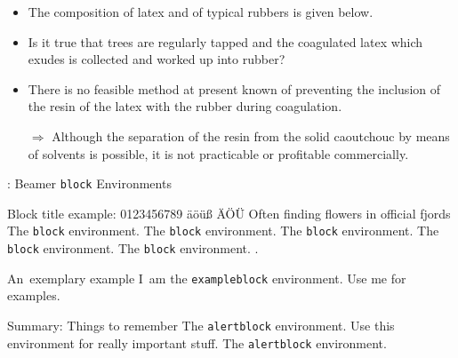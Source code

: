 \begin{frame}{\titleprefix}

	\begin{itemize}
		\item The composition of latex and of typical rubbers is given below.
		\item Is it true that trees are regularly tapped and the coagulated latex which exudes is collected and worked up into rubber?
	\end{itemize}
	
	\pause

	\begin{itemize}
		\item There is no feasible method at present known of preventing the inclusion of the resin of the latex with the rubber during coagulation.
		\item[$\Rightarrow$\hspace{-2.5pt}] Although the separation of the resin from the solid caoutchouc by means of solvents is possible, it is not practicable or profitable commercially.
	\end{itemize}

\end{frame}


\begin{frame}{\titleprefix: Beamer \texttt{block} Environments}

	\begin{block}{Block title example: 0123456789 äöüß ÄÖÜ Often finding flowers in official fjords}
		The \texttt{block} environment. The \texttt{block} environment. The \texttt{block} environment. The \texttt{block} environment. The \texttt{block} environment. \insertblocktitle.\strut  %
	\end{block}%
	
	\begin{exampleblock}{An~exemplary example}
		I~am the \texttt{exampleblock} environment. Use me for examples.\strut  %
	\end{exampleblock}
	
	\begin{alertblock}{Summary: Things to remember}
		The \texttt{alertblock} environment. Use this environment for really important stuff. The \texttt{alertblock} environment.\strut  %
	\end{alertblock}

\end{frame}


